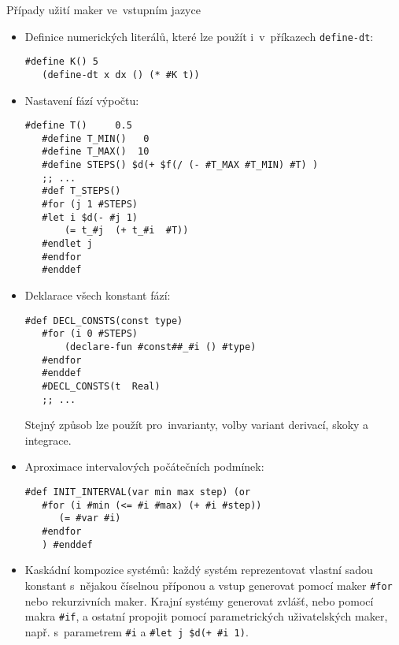\documentclass[thesis=M,czech]{FITthesis}[2012/06/26]
\newcommand{\id}[1]{\texttt{#1}}
\begin{document}

\begin{section}{Případy užití maker ve~vstupním jazyce}
\label{s:macros:use_cases}
\begin{itemize}
\item Definice numerických literálů,
   které lze použít i~v~příkazech \id{define\--dt}:
   \begin{Verbatim}[samepage=true]
   #define K() 5
   (define-dt x dx () (* #K t))
   \end{Verbatim}
\item Nastavení fází výpočtu:
   \begin{Verbatim}[samepage=true]
   #define T()     0.5
   #define T_MIN()   0
   #define T_MAX()  10
   #define STEPS() $d(+ $f(/ (- #T_MAX #T_MIN) #T) )
   ;; ...
   #def T_STEPS()
   #for (j 1 #STEPS)
   #let i $d(- #j 1)
       (= t_#j  (+ t_#i  #T))
   #endlet j
   #endfor
   #enddef
   \end{Verbatim}
\item Deklarace všech konstant fází:
   \begin{Verbatim}[samepage=true]
   #def DECL_CONSTS(const type)
   #for (i 0 #STEPS)
       (declare-fun #const##_#i () #type)
   #endfor
   #enddef
   #DECL_CONSTS(t  Real)
   ;; ...
   \end{Verbatim}
   Stejný způsob lze použít pro~invarianty,
   volby variant derivací, skoky a integrace.
\item Aproximace intervalových počátečních podmínek:
   \begin{Verbatim}[samepage=true]
   #def INIT_INTERVAL(var min max step) (or
   #for (i #min (<= #i #max) (+ #i #step))
      (= #var #i)
   #endfor
   ) #enddef
   \end{Verbatim}
\item Kaskádní kompozice systémů:
   každý systém reprezentovat vlastní sadou konstant
   s~nějakou číselnou příponou
   a vstup generovat pomocí maker \id{\#for}
   nebo rekurzivních maker.
   Krajní systémy generovat zvlášť,
   nebo pomocí makra \id{\#if},
   a ostatní propojit pomocí parametrických uživatelských maker,
   např. s~parametrem \id{\#i} a \id{\#let j \$d(+ \#i 1)}.
\end{itemize}
\end{section} %



\end{document}
